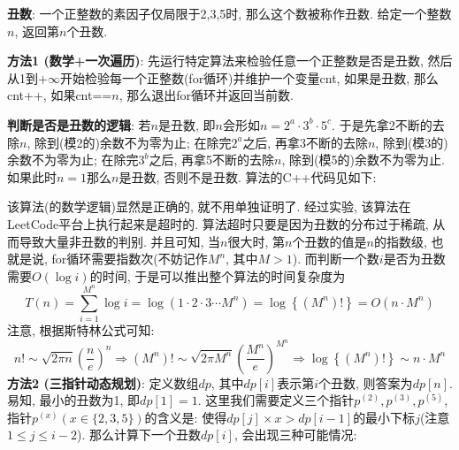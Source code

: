 \documentclass{article}
\begin{document}
\begin{homeworkProblem}
	\textbf{丑数}: 一个正整数的素因子仅局限于2,3,5时, 那么这个数被称作丑数. 给定一个整数$n$, 返回第$n$个丑数.

	\solution \textbf{方法1 (数学+一次遍历)}: 先运行特定算法来检验任意一个正整数是否是丑数, 然后从1到$+\infty$开始检验每一个正整数(for循环)并维护一个变量cnt, 如果是丑数, 那么cnt++, 如果cnt==$n$, 那么退出for循环并返回当前数. 
	
	\textbf{判断是否是丑数的逻辑}: 若$n$是丑数, 即$n$会形如$n=2^a\cdot 3^b\cdot 5^c$. 于是先拿2不断的去除$n$, 除到(模2的)余数不为零为止; 在除完$2^a$之后, 再拿3不断的去除$n$, 除到(模3的)余数不为零为止; 在除完$3^b$之后, 再拿5不断的去除$n$, 除到(模5的)余数不为零为止. 如果此时$n=1$那么$n$是丑数, 否则不是丑数. 算法的C++代码见如下:
	该算法(的数学逻辑)显然是正确的, 就不用单独证明了. 经过实验, 该算法在LeetCode平台上执行起来是超时的. 算法超时只要是因为丑数的分布过于稀疏, 从而导致大量非丑数的判别. 并且可知, 当$n$很大时, 第$n$个丑数的值是$n$的指数级, 也就是说, for循环需要指数次(不妨记作$M^n$, 其中$M>1$). 而判断一个数$i$是否为丑数需要$O(\log i)$的时间, 于是可以推出整个算法的时间复杂度为$$T\left( n \right) =\sum_{i=1}^{M^n}{\log i}=\log \left( 1\cdot 2\cdot 3\cdots M^n \right) =\log \left\{ \left( M^n \right) ! \right\} =O\left( n\cdot M^n \right) 
	$$
	注意, 根据斯特林公式可知: $$n!\sim \sqrt{2\pi n}\left( \frac{n}{e} \right) ^n\Rightarrow \left( M^n \right) !\sim \sqrt{2\pi M^n}\left( \frac{M^n}{e} \right) ^{M^n}\Rightarrow \log \left\{ \left( M^n \right) ! \right\} \sim n\cdot M^n
	$$
	\newpage
	\textbf{方法2 (三指针动态规划)}: 定义数组$dp$, 其中$dp[i]$表示第$i$个丑数, 则答案为$dp[n]$. 易知, 最小的丑数为1, 即$dp[1]=1$. 这里我们需要定义三个指针$p^{(2)},p^{(3)},p^{(5)}$, 指针$p^{(x)}(x\in \{2,3,5\})$的含义是: 使得$dp[j]\times x>dp[i-1]$的最小下标$j$(注意$1\leq j\leq i-2$). 那么计算下一个丑数$dp[i]$, 会出现三种可能情况: 
	

\end{homeworkProblem}
\end{document}
